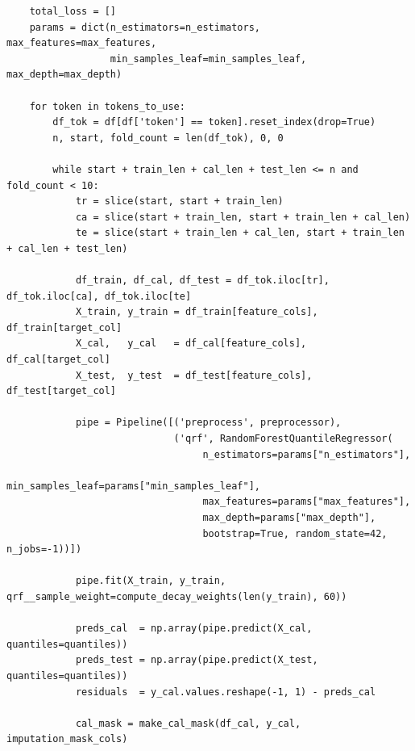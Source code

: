 \documentclass[
  a4paper,
  DIV=11,
  numbers=noendperiod]{scrreprt}
\begin{document}
\begin{verbatim}
    total_loss = []
    params = dict(n_estimators=n_estimators, max_features=max_features,
                  min_samples_leaf=min_samples_leaf, max_depth=max_depth)

    for token in tokens_to_use:
        df_tok = df[df['token'] == token].reset_index(drop=True)
        n, start, fold_count = len(df_tok), 0, 0

        while start + train_len + cal_len + test_len <= n and fold_count < 10:
            tr = slice(start, start + train_len)
            ca = slice(start + train_len, start + train_len + cal_len)
            te = slice(start + train_len + cal_len, start + train_len + cal_len + test_len)

            df_train, df_cal, df_test = df_tok.iloc[tr], df_tok.iloc[ca], df_tok.iloc[te]
            X_train, y_train = df_train[feature_cols], df_train[target_col]
            X_cal,   y_cal   = df_cal[feature_cols],   df_cal[target_col]
            X_test,  y_test  = df_test[feature_cols],  df_test[target_col]

            pipe = Pipeline([('preprocess', preprocessor),
                             ('qrf', RandomForestQuantileRegressor(
                                  n_estimators=params["n_estimators"],
                                  min_samples_leaf=params["min_samples_leaf"],
                                  max_features=params["max_features"],
                                  max_depth=params["max_depth"],
                                  bootstrap=True, random_state=42, n_jobs=-1))])

            pipe.fit(X_train, y_train, qrf__sample_weight=compute_decay_weights(len(y_train), 60))

            preds_cal  = np.array(pipe.predict(X_cal,  quantiles=quantiles))
            preds_test = np.array(pipe.predict(X_test, quantiles=quantiles))
            residuals  = y_cal.values.reshape(-1, 1) - preds_cal

            cal_mask = make_cal_mask(df_cal, y_cal, imputation_mask_cols)


\end{verbatim}
\end{document}

